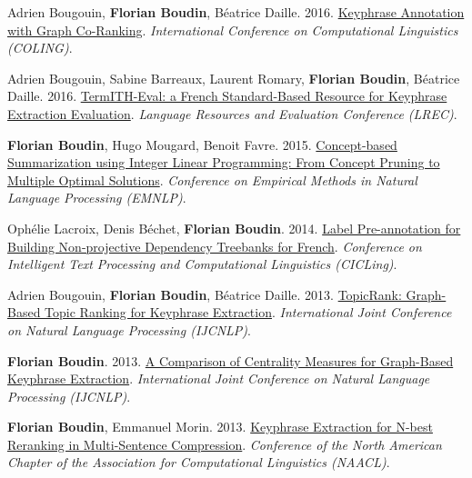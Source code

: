 \item 
Adrien Bougouin, \textbf{Florian Boudin}, Béatrice Daille.
2016.
\href{https://aclanthology.org/C16-1277.pdf}{Keyphrase Annotation with Graph Co-Ranking}.
\textit{International Conference on Computational Linguistics (COLING)}.
\label{bougouin-etal-2016-keyphrase}

\item 
Adrien Bougouin, Sabine Barreaux, Laurent Romary, \textbf{Florian Boudin}, Béatrice Daille.
2016.
\href{https://aclanthology.org/L16-1304.pdf}{TermITH-Eval: a French Standard-Based Resource for Keyphrase Extraction Evaluation}.
\textit{Language Resources and Evaluation Conference (LREC)}.
\label{bougouin-etal-2016-termith}

\item 
\textbf{Florian Boudin}, Hugo Mougard, Benoit Favre.
2015.
\href{https://aclanthology.org/D15-1220.pdf}{Concept-based Summarization using Integer Linear Programming: From Concept Pruning to Multiple Optimal Solutions}.
\textit{Conference on Empirical Methods in Natural Language Processing (EMNLP)}.
\label{boudin-etal-2015-concept}

\item 
Ophélie Lacroix, Denis Béchet, \textbf{Florian Boudin}.
2014.
\href{https://hal.archives-ouvertes.fr/hal-01004007/file/CICLing2014.pdf}{Label Pre-annotation for Building Non-projective Dependency Treebanks for French}.
\textit{Conference on Intelligent Text Processing and Computational Linguistics (CICLing)}.
\label{lacroix-etal-2014-label}

\item
Adrien Bougouin, \textbf{Florian Boudin}, Béatrice Daille.
2013.
\href{https://aclanthology.org/I13-1062.pdf}{TopicRank: Graph-Based Topic Ranking for Keyphrase Extraction}.
\textit{International Joint Conference on Natural Language Processing (IJCNLP)}.
\label{bougouin-etal-2013-topicrank}

\item 
\textbf{Florian Boudin}.
2013.
\href{https://aclanthology.org/I13-1102.pdf}{A Comparison of Centrality Measures for Graph-Based Keyphrase Extraction}.
\textit{International Joint Conference on Natural Language Processing (IJCNLP)}.
\label{boudin-2013-comparison}

\item
\textbf{Florian Boudin}, Emmanuel Morin.
2013.
\href{https://aclanthology.org/N13-1030.pdf}{Keyphrase Extraction for N-best Reranking in Multi-Sentence Compression}.
\textit{Conference of the North American Chapter of the Association for Computational Linguistics (NAACL)}.
\label{boudin-morin-2013-keyphrase}

